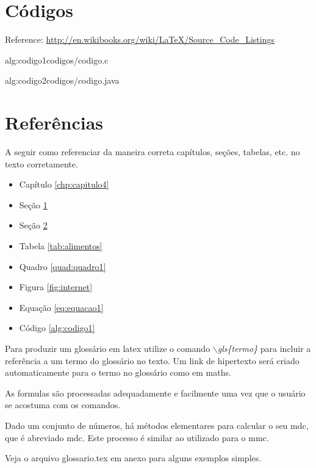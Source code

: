 \section{Códigos}
\label{sec:codigos}
Reference: \url{http://en.wikibooks.org/wiki/LaTeX/Source_Code_Listings}

 {alg:codigo1}{codigos/codigo.c}

 {alg:codigo2}{codigos/codigo.java}

\section{Referências}
\label{sec:referencias}

A seguir como referenciar da maneira correta capítulos, seções, tabelas, etc. no texto corretamente.\\

\begin{itemize}
  \item Capítulo \ref{chp:capitulo4}
  \item Seção \ref{sec:codigos}
  \item Seção \ref{sec:referencias}
  \item Tabela \ref{tab:alimentos}
  \item Quadro \ref{quad:quadro1}
  \item Figura \ref{fig:internet}
  \item Equação \ref{eq:equacao1}
  \item Código \ref{alg:codigo1}
\end{itemize}

Para produzir um glossário em \Gls{latex} utilize o comando \emph{$\backslash$gls\{termo\}} para incluir a referência a um termo do glossário no texto. Um link de hipertexto será criado automaticamente para o termo no glossário como em \gls{maths}. 

As \glspl{formula} são processadas adequadamente e facilmente uma vez que o usuário se acostuma com os comandos. 
 
Dado um conjunto de números, há métodos elementares para calcular o seu \acrlong{mdc}, que é abreviado \acrshort{mdc}. Este processo é similar ao utilizado para o  \acrfull{mmc}.

Veja o arquivo glossario.tex em anexo para alguns exemplos simples.

